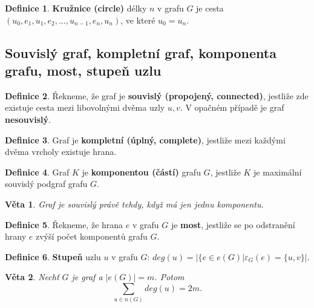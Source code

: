 \documentclass[a4]{report}
\newtheorem{theorem}{Věta}
\theoremstyle{definition}
\newtheorem{definition}{Definice}[section]
\begin{document}
\begin{definition}
\textbf{Kružnice (circle)} délky $n$ v grafu $G$ je cesta $(u_0, e_1, u_1, e_2, \ldots, u_{n-1}, e_n, u_n)$, ve které $u_0 = u_n$.
\end{definition}

\subsection{Souvislý graf, kompletní graf, komponenta grafu, most, stupeň uzlu}

\begin{definition}
Řekneme, že graf je \textbf{souvislý (propojený, connected)}, jestliže zde existuje cesta mezi libovolnými dvěma uzly $u,v$. V opačném případě je graf \textbf{nesouvislý}.
\end{definition}

\begin{definition}
Graf je \textbf{kompletní (úplný, complete)}, jestliže mezi každými dvěma vrcholy existuje hrana. 
\end{definition}

\begin{definition}
Graf $K$ je \textbf{komponentou (částí)} grafu $G$, jestliže $K$ je maximální souvislý podgraf grafu $G$.
\end{definition}

\begin{theorem}
Graf je souvislý právě tehdy, když má jen jednu komponentu.
\end{theorem}

\begin{definition}
Řekneme, že hrana $e$ v grafu $G$ je \textbf{most}, jestliže se po odstranění hrany $e$ zvýší počet komponentů grafu $G$.
\end{definition}

\begin{definition}
\textbf{Stupeň} uzlu $u$ v grafu $G$: $deg(u) = | \{e \in e(G) | \varepsilon_G (e) = \{ u, v \} |$.
\end{definition}

\begin{theorem}
Nechť $G$ je graf a $|e(G)| = m$. Potom
$$ \sum_{u \in n(G)} deg(u) = 2m.$$
\end{theorem}
\end{document}
